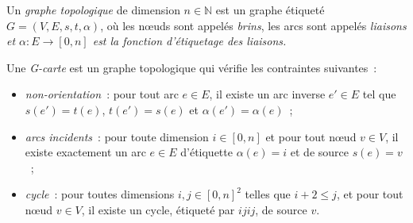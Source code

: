 \begin{definition}[G-carte]\label{def:cartes-generalisees}%
	\label{def:gcarte}
	Un \emph{graphe topologique} de dimension $n \in \mathbb{N}$ est un graphe étiqueté
	$G = (V,E,s,t,\alpha)$, où les n\oe uds sont appelés \emph{brins}, les arcs sont appelés \em{liaisons} et $\alpha : E \to [0,n]$ est la fonction d'étiquetage des liaisons.

	Une \emph{G-carte} est un graphe topologique
	qui vérifie les contraintes suivantes~:
	\begin{itemize}
		\item \emph{non-orientation}~: pour tout arc $e \in E$, il existe un arc
		      inverse $e' \in E$ tel que $s(e') = t(e)$, $t(e') = s(e)$ et
		      $\alpha(e') = \alpha(e)$~;
		\item \emph{arcs incidents}~: pour toute dimension $i \in [0,n]$ et pour
		      tout n\oe ud $v \in V$, il existe exactement un arc $e \in E$ d'étiquette
		      $\alpha(e)=i$ et de source $s(e)=v$~;
		\item \emph{cycle}~: pour toutes dimensions $i, j \in [0,n]^{2}$ telles que
		      $i+2 \leq j$, et pour tout n\oe ud $v \in V$, il existe un cycle, étiqueté
		      par \emph{$ijij$}, de source $v$.
	\end{itemize}
\end{definition}


